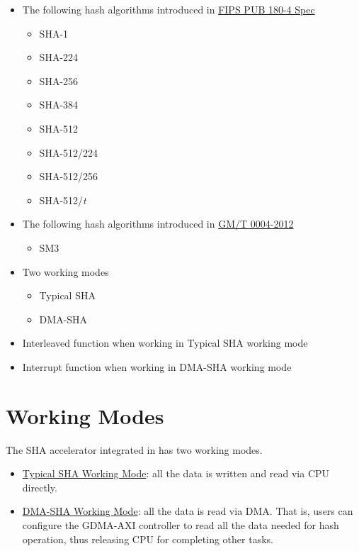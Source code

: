 \documentclass[main\_\_EN.tex]{subfiles}
\begin{document}
\begin{itemize}
    \item The following hash algorithms introduced in   \href{https://doi.org/10.6028/NIST.FIPS.180-4}{FIPS PUB 180-4 Spec}
    \begin{itemize}
        \item SHA-1
        \item SHA-224
        \item SHA-256
        \item SHA-384
        \item SHA-512
        \item SHA-512/224
        \item SHA-512/256
        \item SHA-512/{\it{t}}
    \end{itemize}
    \item The following hash algorithms introduced in   \href{http://www.gmbz.org.cn/file/2018-01-08/6db059ec-61e1-4ff9-b112-ae15471ad6b5.PDF}{GM/T 0004-2012}
    \begin{itemize}
        \item SM3
    \end{itemize}
    \item Two working modes
    \begin{itemize}
        \item Typical SHA
        \item DMA-SHA
    \end{itemize}
    \item Interleaved function when working in Typical SHA working mode
    \item Interrupt function when working in DMA-SHA working mode
\end{itemize}


\section{Working Modes}
The SHA accelerator integrated in \chipname{} has two working modes.

\begin{itemize}
    \item \hyperref[sec:sha-typical-sha]{Typical SHA Working Mode}: all the data is written and read via CPU directly.
    \item \hyperref[sec:sha-dma-sha]{DMA-SHA Working Mode}: all the data is read via DMA. That is, users can configure the GDMA-AXI controller to read all the data needed for hash operation, thus releasing CPU for completing other tasks.
\end{itemize}
\end{document}
